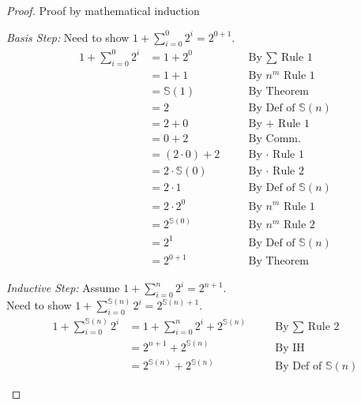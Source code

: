 \documentclass{article}
\newcommand{\s}{\mathbb{S}}
\newenvironment{case}[1][Case]
    {\par\textit{#1:}\hfill\break}
    {}
\begin{document}
\begin{enumerate}
    \begin{proof}
    Proof by mathematical induction
    \begin{multicols}{2}
    \begin{case}[Basis Step]
    Need to show $1+\sum_{i = 0}^{0} 2^i = 2^{0 + 1}$.
    \begin{align*}
      1+\sum_{i = 0}^{0} 2^i
        &=1+2^0
        &\quad
        &\text{By $\sum$ Rule 1}
          \\
        &=1+1
        &\quad
        &\text{By $n^m$ Rule 1}
          \\
        &=\s(1)
        &\quad
        &\text{By Theorem}
          \\
        &=2
        &\quad
        &\text{By Def of $\s(n)$}
          \\
        &=2+0
        &\quad
        &\text{By $+$ Rule 1}
          \\
        &=0+2
        &\quad
        &\text{By Comm.}
          \\
        &=(2\cdot0)+2
        &\quad
        &\text{By $\cdot$ Rule 1}
          \\
        &=2\cdot\s(0)
        &\quad
        &\text{By $\cdot$ Rule 2}
          \\
        &=2\cdot1
        &\quad
        &\text{By Def of $\s(n)$}
          \\
        &=2\cdot2^0
        &\quad
        &\text{By $n^m$ Rule 1}
          \\
        &=2^{\s(0)}
        &\quad
        &\text{By $n^m$ Rule 2}
          \\
        &=2^{1}
        &\quad
        &\text{By Def of $\s(n)$}
          \\
        &=2^{0+1}
        &\quad
        &\text{By Theorem}
    \end{align*}
    \end{case}
    \columnbreak
    \begin{case}[Inductive Step]
    Assume $1+\sum_{i = 0}^{n} 2^i = 2^{n + 1}$.\\
    Need to show $1+\sum_{i = 0}^{\s(n)} 2^i = 2^{\s(n) + 1}$.
    \begin{align*}
      1+\sum_{i = 0}^{\s(n)} 2^i
        &=1+\sum_{i = 0}^{n} 2^i+2^{\s(n)}
        &\quad
        &\text{By $\sum$ Rule 2}
          \\
        &=2^{n+1}+2^{\s(n)}
        &\quad
        &\text{By IH}
          \\
        &=2^{\s(n)}+2^{\s(n)}
        &\quad
        &\text{By Def of }\s(n) 

\end{align*}
\end{case}
\end{multicols}
\end{proof}
\end{enumerate}
\end{document}
